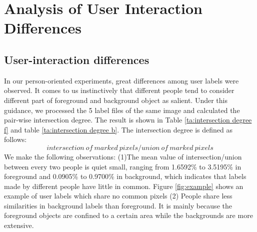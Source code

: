 \documentclass[runningheads,a4paper]{llncs}
\begin{document}
\section{Analysis of User Interaction Differences}

\subsection{User-interaction differences}
In our person-oriented experiments, great differences among user labels were observed. It comes to us instinctively that different people tend to consider different part of foreground and background object as salient. Under this guidance, we processed the 5 label files of the same image and calculated the pair-wise intersection degree. The result is shown in Table \ref{ta:intersection degree f} and table \ref{ta:intersection degree b}. The intersection degree is defined as follows:
$$intersection\ of\ marked\ pixels/union\ of\ marked\ pixels$$
We make the following observations: (1)The mean value of intersection/union between every two people is quiet small, ranging from 1.6592\% to 3.5195\% in foreground and 0.0905\% to 0.9700\% in background, which indicates that labels made by different people have little in common. Figure \ref{fig:example} shows an example of user labels which share no common pixels (2) People share less similarities in background labels than foreground. It is mainly because the foreground objects are confined to a certain area while the backgrounds are more extensive.
\end{document}
